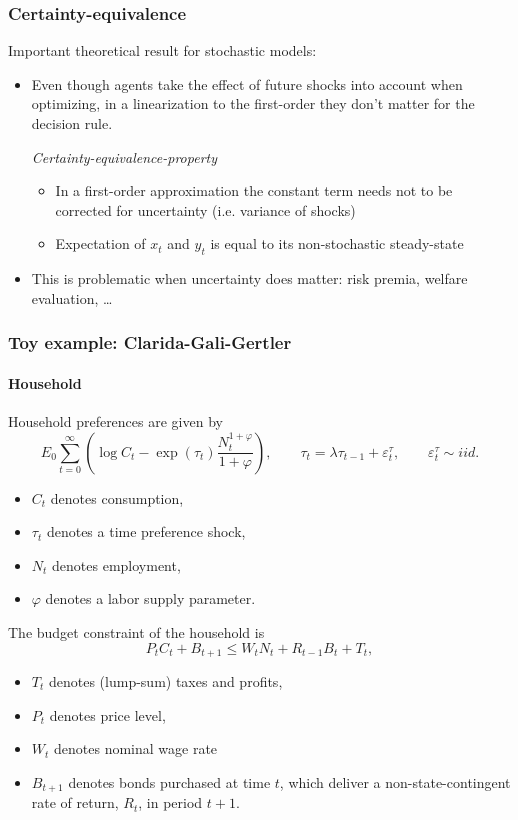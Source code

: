 \documentclass[handout]{beamer}  %
\begin{document}
\begin{frame}
	\frametitle{Certainty-equivalence}
	Important theoretical result for stochastic models:
	\begin{itemize}
		\item Even though agents take the effect of future shocks into account when optimizing, in a linearization to the first-order they don't matter for the decision rule.
		\begin{block}{\emph{Certainty-equivalence-property}}
			\begin{itemize}
				\item In a first-order approximation the constant term needs not to be corrected for uncertainty (i.e. variance of shocks)
				\item Expectation of $x_t$ and $y_t$ is equal to its non-stochastic steady-state
			\end{itemize}
		\end{block}
		\item This is problematic when uncertainty does matter: risk premia, welfare evaluation, \dots
	\end{itemize}
\end{frame}




\begin{frame}
  \frametitle{Toy example: Clarida-Gali-Gertler}\framesubtitle{Household}\footnotesize
Household preferences are given by
\begin{equation*}
E_{0}\sum_{t=0}^{\infty }\left( \log C_{t}-\exp \left( \tau _{t}\right)
\frac{N_{t}^{1+\varphi }}{1+\varphi }\right) ,\qquad \tau_{t}=\lambda \tau_{t-1}+\varepsilon_{t}^{\tau },\qquad \varepsilon_{t}^{\tau }\sim iid.
\end{equation*}
\begin{itemize}
\item $C_{t}$ denotes consumption,
\item $\tau_{t}$ denotes a time preference shock,
\item $N_{t}$ denotes employment,
\item $\varphi$ denotes a labor supply parameter.
\end{itemize}
The budget constraint of the household is
\begin{equation*}
  P_{t}C_{t}+B_{t+1}\leq W_{t}N_{t}+R_{t-1}B_{t}+T_{t},
\end{equation*}
\begin{itemize}
  \item $T_t$ denotes (lump-sum) taxes and profits,
  \item $P_t$ denotes price level,
  \item $W_t$ denotes nominal wage rate
  \item $B_{t+1}$ denotes bonds purchased at time $t$, which deliver a non-state-contingent rate of return, $R_{t}$, in period $t+1.$
\end{itemize}
\end{frame}
\end{document}
